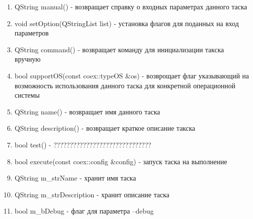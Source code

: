 \begin{enumerate}
\item QString manual() - возвращает справку о входных параметрах данного таска
\item void setOption(QStringList list) - установка флагов для поданных на вход параметров
\item QString command() - возвращает команду для инициализации такска вручную
\item bool supportOS(const coex::typeOS &os) - возврощает флаг указывающий на возможность использования данного таска для конкретной операционной системы
\item QString name() - возвращает имя данного таска
\item QString description() - возвращает краткое описание такска
\item bool test() - ??????????????????????????????
\item bool execute(const coex::config &config) - запуск таска на выполнение
\item QString m_strName - хранит имя таска
\item QString m_strDescription - хранит описание таска
\item bool m_bDebug - флаг для параметра --debug
\end{enumerate}